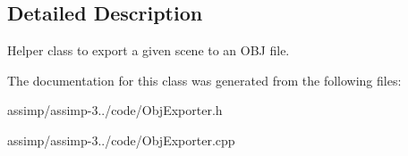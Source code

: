 \subsection{Detailed Description}
Helper class to export a given scene to an O\+B\+J file. 

The documentation for this class was generated from the following files\+:\begin{DoxyCompactItemize}
\item 
assimp/assimp-\/3../code/Obj\+Exporter.\+h\item 
assimp/assimp-\/3../code/Obj\+Exporter.\+cpp\end{DoxyCompactItemize}
